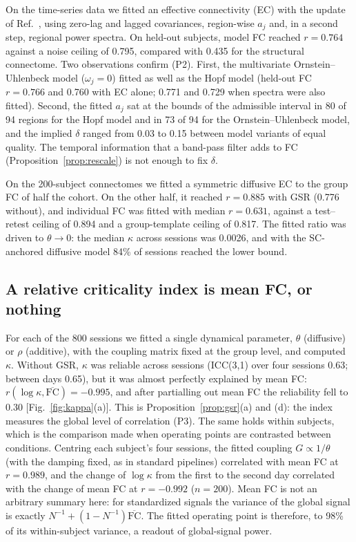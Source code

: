 \documentclass[aip,cha,reprint,amsmath,amssymb]{revtex4-2}
\theoremstyle{remark}
\newcommand{\FC}{\mathrm{FC}}
\begin{document}
On the time-series data we fitted an effective connectivity (EC) with the update of Ref.~, using zero-lag and lagged covariances, region-wise $a_j$ and, in a second step, regional power spectra. On held-out subjects, model FC reached $r=0.764$ against a noise ceiling of 0.795, compared with 0.435 for the structural connectome. Two observations confirm (P2). First, the multivariate Ornstein--Uhlenbeck model ($\omega_j=0$) fitted as well as the Hopf model (held-out FC $r=0.766$ and 0.760 with EC alone; 0.771 and 0.729 when spectra were also fitted). Second, the fitted $a_j$ sat at the bounds of the admissible interval in 80 of 94 regions for the Hopf model and in 73 of 94 for the Ornstein--Uhlenbeck model, and the implied $\delta$ ranged from 0.03 to 0.15 between model variants of equal quality. The temporal information that a band-pass filter adds to FC (Proposition~\ref{prop:rescale}) is not enough to fix $\delta$.

On the 200-subject connectomes we fitted a symmetric diffusive EC to the group FC of half the cohort. On the other half, it reached $r=0.885$ with GSR (0.776 without), and individual FC was fitted with median $r=0.631$, against a test--retest ceiling of 0.894 and a group-template ceiling of 0.817. The fitted ratio was driven to $\theta\to0$: the median $\kappa$ across sessions was 0.0026, and with the SC-anchored diffusive model 84\% of sessions reached the lower bound.

\subsection{A relative criticality index is mean FC, or nothing}\label{sec:kappa}

For each of the 800 sessions we fitted a single dynamical parameter, $\theta$ (diffusive) or $\rho$ (additive), with the coupling matrix fixed at the group level, and computed $\kappa$. Without GSR, $\kappa$ was reliable across sessions (ICC(3,1) over four sessions 0.63; between days 0.65), but it was almost perfectly explained by mean FC: $r(\log\kappa,\overline{\FC})=-0.995$, and after partialling out mean FC the reliability fell to 0.30 [Fig.~\ref{fig:kappa}(a)]. This is Proposition~\ref{prop:gsr}(a) and (d): the index measures the global level of correlation (P3). The same holds within subjects, which is the comparison made when operating points are contrasted between conditions. Centring each subject's four sessions, the fitted coupling $G\propto1/\theta$ (with the damping fixed, as in standard pipelines) correlated with mean FC at $r=0.989$, and the change of $\log\kappa$ from the first to the second day correlated with the change of mean FC at $r=-0.992$ ($n=200$). Mean FC is not an arbitrary summary here: for standardized signals the variance of the global signal is exactly $N^{-1}+(1-N^{-1})\overline{\FC}$. The fitted operating point is therefore, to 98\% of its within-subject variance, a readout of global-signal power.
\end{document}
